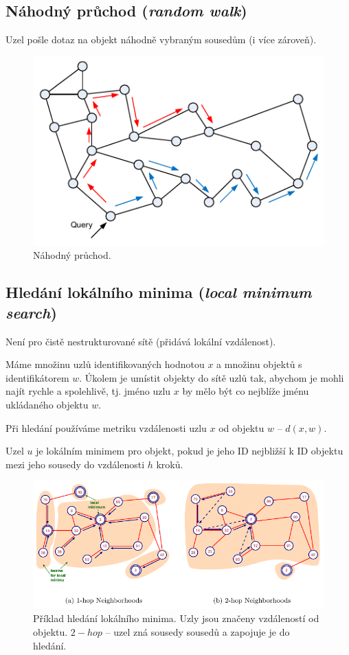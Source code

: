 \subsection{Náhodný průchod (\textit{random walk})} \begin{compactitem}
    \item Uzel pošle dotaz na objekt náhodně vybraným sousedům (i více zároveň).
\end{compactitem}

\begin{figure}[H]
    \centering
    \includegraphics[width=0.6\linewidth]{random_walk.pdf}
    \caption{Náhodný průchod.}
\end{figure}

\subsection{Hledání lokálního minima (\textit{local minimum search})} \begin{compactitem}
    \item Není pro čistě nestrukturované sítě (přidává lokální vzdálenost).
    \item Máme množinu uzlů identifikovaných hodnotou $x$ a množinu objektů s identifikátorem $w$. Úkolem je umístit objekty do sítě uzlů tak, abychom je mohli najít rychle a spolehlivě, tj. jméno uzlu $x$ by mělo být co nejblíže jménu ukládaného objektu $w$.
    \item Při hledání používáme metriku vzdálenosti uzlu $x$ od objektu $w$ -- $d(x, w)$.
    \item Uzel $u$ je lokálním minimem pro objekt, pokud je jeho ID nejbližší k ID objektu mezi jeho sousedy do vzdálenosti $h$ kroků.
\end{compactitem}

\begin{figure}[H]
    \centering
    \includegraphics[width=1\linewidth]{lms.pdf}
    \caption{Příklad hledání lokálního minima. Uzly jsou značeny vzdáleností od objektu. $2-hop$ -- uzel zná sousedy sousedů a zapojuje je do hledání.}
\end{figure}

